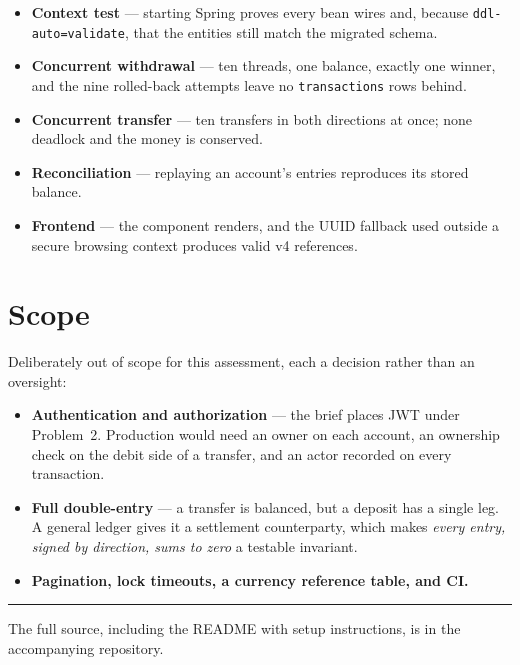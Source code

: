 \documentclass[11pt,a4paper]{article}
\begin{document}
\begin{itemize}[leftmargin=*, itemsep=2pt]
  \item \textbf{Context test} --- starting Spring proves every bean wires and, because
        \texttt{ddl-auto=validate}, that the entities still match the migrated schema.
  \item \textbf{Concurrent withdrawal} --- ten threads, one balance, exactly one winner, and the
        nine rolled-back attempts leave no \texttt{transactions} rows behind.
  \item \textbf{Concurrent transfer} --- ten transfers in both directions at once; none deadlock
        and the money is conserved.
  \item \textbf{Reconciliation} --- replaying an account's entries reproduces its stored balance.
  \item \textbf{Frontend} --- the component renders, and the UUID fallback used outside a secure
        browsing context produces valid v4 references.
\end{itemize}

\section{Scope}\label{sec:scope}

Deliberately out of scope for this assessment, each a decision rather than an oversight:

\begin{itemize}[leftmargin=*, itemsep=2pt]
  \item \textbf{Authentication and authorization} --- the brief places JWT under Problem~2.
        Production would need an owner on each account, an ownership check on the debit side of a
        transfer, and an actor recorded on every transaction.
  \item \textbf{Full double-entry} --- a transfer is balanced, but a deposit has a single leg. A
        general ledger gives it a settlement counterparty, which makes \emph{every entry, signed by
        direction, sums to zero} a testable invariant.
  \item \textbf{Pagination, lock timeouts, a currency reference table, and CI.}
\end{itemize}

\vspace{4mm}
\noindent\textcolor{muted}{\rule{\linewidth}{0.4pt}}
\vspace{1mm}

\noindent\small The full source, including the README with setup instructions, is in the
accompanying repository.
\end{document}

